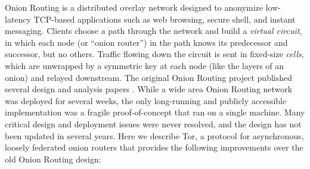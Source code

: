 \documentclass[times,10pt,twocolumn]{article}
\begin{document}
Onion Routing is a distributed overlay network designed to anonymize
low-latency TCP-based applications such as web browsing, secure shell,
and instant messaging. Clients choose a path through the network and
build a \emph{virtual circuit}, in which each node (or ``onion router'') 
in the path knows its
predecessor and successor, but no others. Traffic flowing down the circuit
is sent in fixed-size \emph{cells}, which are unwrapped by a symmetric key
at each node (like the layers of an onion) and relayed downstream. The
original Onion Routing project published several design and analysis
papers
\cite{or-ih96,or-jsac98,or-discex00,or-pet00}. While
a wide area Onion Routing network was deployed for several weeks,
the only long-running and publicly accessible
implementation was a fragile proof-of-concept that ran on a single
machine.
Many critical design and deployment issues were never resolved,
and the design has not been updated in several years.
Here we describe Tor, a protocol for asynchronous, loosely
federated onion routers that provides the following improvements over
the old Onion Routing design:
\end{document}
